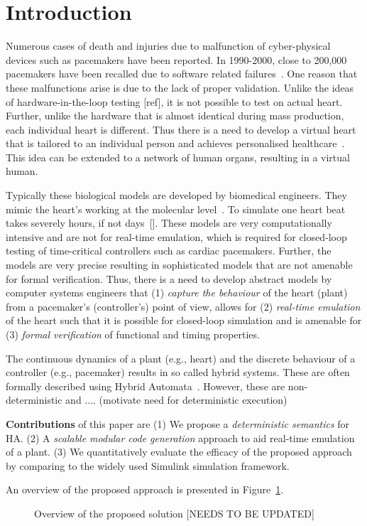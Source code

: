 \section{Introduction}

Numerous cases of death and injuries due to malfunction of 
cyber-physical devices such as  pacemakers have been reported.
In 1990-2000, close to 200,000 pacemakers have been recalled
due to software related failures~\cite{alemzadeh13}.
 One reason that these malfunctions
arise is due to the lack of proper validation.
Unlike the ideas of hardware-in-the-loop testing [ref],
it is not possible to test on actual heart.
Further, unlike the hardware that is almost identical 
during mass production, each individual heart is different.
Thus there is a need to develop a virtual heart that is tailored
to an individual person and achieves
 personalised healthcare~\cite{Trayanova2014}. This idea can be extended 
to a network of human organs, resulting in a virtual human.

Typically these biological  models are  developed by biomedical engineers.
They mimic the heart's working at the
molecular level~\cite{Trayanova2014}. 
To simulate one heart beat takes severely hours, if not days~[].
These models are very computationally intensive and 
are not for real-time emulation,
which is required for closed-loop testing of time-critical 
controllers such as cardiac pacemakers.
Further, the models are 
 very precise resulting in sophisticated models that 
 are not amenable for  formal verification. 
Thus, there is a need to develop abstract models 
by computer systems engineers that  
(1)  \emph{capture the behaviour} of the heart (plant) 
from a pacemaker's (controller's) point of view,
allows for (2) \emph{real-time emulation} of the heart 
such that it is possible for closed-loop simulation and
is amenable for (3) \emph{formal verification} of 
functional and timing properties.


The continuous dynamics of a plant (e.g., heart) and
 the discrete behaviour of a controller (e.g., pacemaker) 
 results in so called hybrid systems. 
 These are often formally described using Hybrid Automata~\cite{alur2015principles,raskin05,chen201487}.
 However, these are non-deterministic and ....
 (motivate need for deterministic execution)
 
 \textbf{Contributions} of this paper are 
 (1) We propose a \emph{deterministic semantics} for \acf{HA}.
 (2) A \emph{scalable modular code generation} approach 
 to aid real-time emulation
     of a plant.
  (3) We quantitatively evaluate the efficacy of the 
  proposed approach by comparing  
   to the widely used Simulink\textsuperscript{\textregistered}
   simulation framework.
   
 An overview of the proposed approach is presented
 in Figure~\ref{fig:overview}.
 
 \begin{figure}[thbp]
 	\centering
 	\scalebox{0.7}{
	 
	}
	 \caption{Overview of the proposed solution 
	 	[NEEDS TO BE UPDATED] \label{fig:overview}}
\end{figure}
      
 
 
